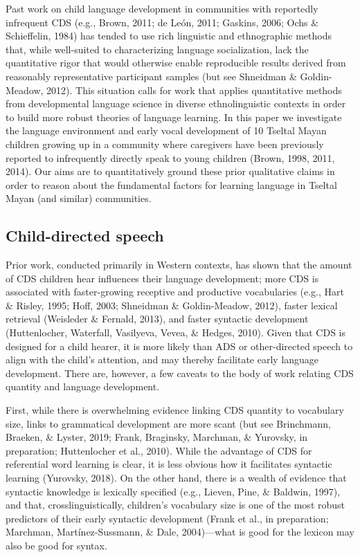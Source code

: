 \documentclass[floatsintext,man]{apa6}
\theoremstyle{definition}
\theoremstyle{definition}
\theoremstyle{definition}
\theoremstyle{remark}
\begin{document}
Past work on child language development in communities with reportedly
infrequent CDS (e.g., Brown, 2011; de León, 2011; Gaskins, 2006; Ochs \&
Schieffelin, 1984) has tended to use rich linguistic and ethnographic
methods that, while well-suited to characterizing language
socialization, lack the quantitative rigor that would otherwise enable
reproducible results derived from reasonably representative participant
samples (but see Shneidman \& Goldin-Meadow, 2012). This situation calls
for work that applies quantitative methods from developmental language
science in diverse ethnolinguistic contexts in order to build more
robust theories of language learning. In this paper we investigate the
language environment and early vocal development of 10 Tseltal Mayan
children growing up in a community where caregivers have been previously
reported to infrequently directly speak to young children (Brown, 1998,
2011, 2014). Our aims are to quantitatively ground these prior
qualitative claims in order to reason about the fundamental factors for
learning language in Tseltal Mayan (and similar) communities.

\subsection{Child-directed speech}\label{intro-cds}

Prior work, conducted primarily in Western contexts, has shown that the
amount of CDS children hear influences their language development; more
CDS is associated with faster-growing receptive and productive
vocabularies (e.g., Hart \& Risley, 1995; Hoff, 2003; Shneidman \&
Goldin-Meadow, 2012), faster lexical retrieval (Weisleder \& Fernald,
2013), and faster syntactic development (Huttenlocher, Waterfall,
Vasilyeva, Vevea, \& Hedges, 2010). Given that CDS is designed for a
child hearer, it is more likely than ADS or other-directed speech to
align with the child's attention, and may thereby facilitate early
language development. There are, however, a few caveats to the body of
work relating CDS quantity and language development.

First, while there is overwhelming evidence linking CDS quantity to
vocabulary size, links to grammatical development are more scant (but
see Brinchmann, Braeken, \& Lyster, 2019; Frank, Braginsky, Marchman, \&
Yurovsky, in preparation; Huttenlocher et al., 2010). While the
advantage of CDS for referential word learning is clear, it is less
obvious how it facilitates syntactic learning (Yurovsky, 2018). On the
other hand, there is a wealth of evidence that syntactic knowledge is
lexically specified (e.g., Lieven, Pine, \& Baldwin, 1997), and that,
crosslinguistically, children's vocabulary size is one of the most
robust predictors of their early syntactic development (Frank et al., in
preparation; Marchman, Martínez-Sussmann, \& Dale, 2004)---what is good
for the lexicon may also be good for syntax.
\end{document}
